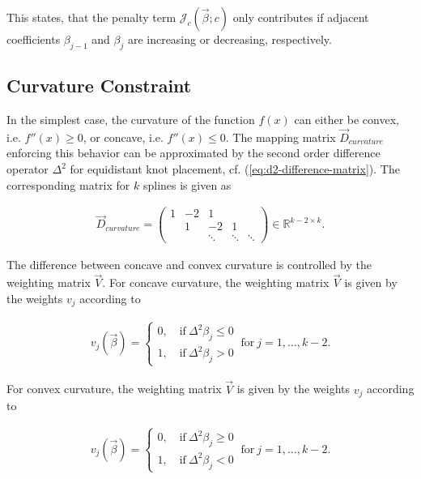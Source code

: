 This states, that the penalty term $\mathcal{J}_c(\vec{\beta}; c)$ only contributes if adjacent coefficients $\beta_{j-1}$ and $\beta_j$ are increasing or decreasing, respectively. \cite{hofner2011monotonicity} \cite{eilers2005unimodal}

\subsection{Curvature Constraint}

In the simplest case, the curvature of the function $f(x)$ can either be convex, i.e. $f''(x) \ge 0$, or concave, i.e. $f''(x) \le 0$. The mapping matrix $\vec{D}_{curvature}$ enforcing this behavior can be approximated by the second order difference operator $\Delta^2$ for equidistant knot placement, cf. (\ref{eq:d2-difference-matrix}). The corresponding matrix for $k$ splines is given as

\begin{align} \label{eq:D_c_curvature}
	\vec{D}_{curvature} = \begin{pmatrix} 1 & -2 & 1 		&  		 & \\ 
		& 1  &-2 	    &1 		 & \\
		& 	  & \ddots  & \ddots & \ddots  
	\end{pmatrix} \in \mathbb{R}^{k-2 \times k}.
\end{align}	

The difference between concave and convex curvature is controlled by the weighting matrix $\vec{V}$. For concave curvature, the weighting matrix $\vec{V}$ is given by the weights $v_j$ according to

\begin{align}\label{eq:v_curvature_concave}
	v_j(\vec{\beta}) = \begin{cases} 
		0, \quad \text{if} \ \Delta^2\beta_j \le 0 \\ 
		1, \quad \text{if} \ \Delta^2\beta_j > 0
	\end{cases} \ \text{for} \ j=1, \dots, k-2.
\end{align}

For convex curvature, the weighting matrix $\vec{V}$ is given by the weights $v_j$ according to

\begin{align}\label{eq:v_curvature_convex}
	v_j(\vec{\beta}) = \begin{cases} 
		0, \quad \text{if} \ \Delta^2\beta_j \ge 0 \\ 
		1, \quad \text{if} \ \Delta^2\beta_j < 0
	\end{cases}\ \text{for} \ j=1, \dots, k-2.
\end{align}	

